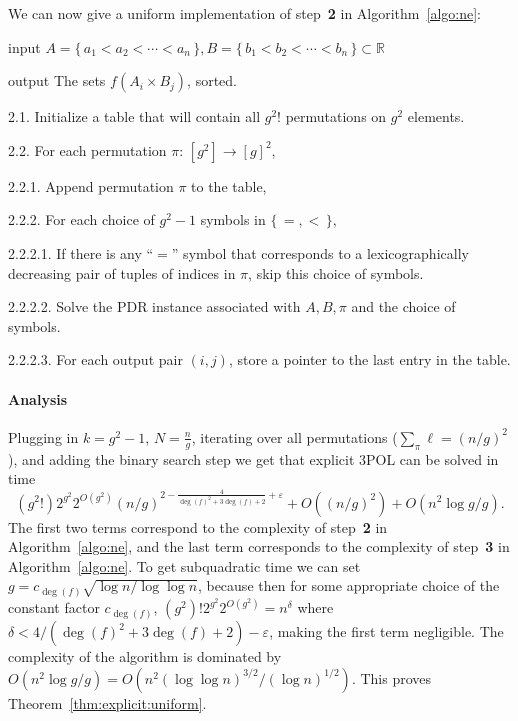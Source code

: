 We can now give a uniform implementation of step~\textbf{2} in
Algorithm~\ref{algo:ne}:
\begin{algorithm}\label{algo:sfaixbj-uniform}
\item[input] $A = \{\,a_1<a_2<\cdots<a_n\,\},B = \{\,b_1<b_2<\cdots<b_n\,\}
    \subset \mathbb{R}$
\item[output] The sets $f(A_i \times B_j)$, sorted.
\item[2.1.] Initialize a table that will contain all $ g^2! $ permutations on $g^2$ elements.
\item[2.2.] For each permutation $\pi\colon\,[g^2]\to{[g]}^2$,
\item[2.2.1.] Append permutation $\pi$ to the table,
\item[2.2.2.] For each choice of $g^2-1$ symbols in $\{\,=,<\,\}$,
\item[2.2.2.1.] If there is any ``$=$'' symbol that corresponds to a
    lexicographically decreasing
    pair of tuples of indices in $\pi$, skip this choice of symbols.
\item[2.2.2.2.] Solve the PDR instance associated
    with $A,B,\pi$ and the choice of symbols.
\item[2.2.2.3.] For each output pair $(i,j)$, store a pointer
    to the last entry in the table.
\end{algorithm}


\paragraph{Analysis} Plugging in $k=g^2-1$, $N=\frac ng$, iterating over all
permutations ($\sum_{\pi} \ell = {(n/g)}^2$), and adding the binary search step we
get that
explicit 3POL can be solved in time
\begin{displaymath}
    (g^2!)2^{g^2}2^{O(g^2)}
    {(n/g)}^{2-\frac{4}{{\deg(f)}^2+3\deg(f)+2}+\varepsilon} + O({(n/g)}^2) +
    O(n^2 \log g / g).
\end{displaymath}
The first two terms correspond to the complexity of step~\textbf{2} in
Algorithm~\ref{algo:ne}, and the last term corresponds to the complexity of
step~\textbf{3} in Algorithm~\ref{algo:ne}.
To get subquadratic time we can set
$g = c_{\deg(f)}\sqrt{\log n/\log \log n}$,
because then
for some appropriate choice of the constant factor $c_{\deg(f)}$,
$(g^2)!2^{g^2}2^{O(g^2)} = n^{\delta}$ where $\delta<
4/({\deg(f)}^2+3\deg(f)+2) - \varepsilon$, making the first term negligible.
The complexity of the algorithm is dominated by $O(n^2 \log g / g) = O(n^2
{(\log \log n)}^{3/2} / {(\log n)}^{1/2} )$.
This proves Theorem~\ref{thm:explicit:uniform}.

